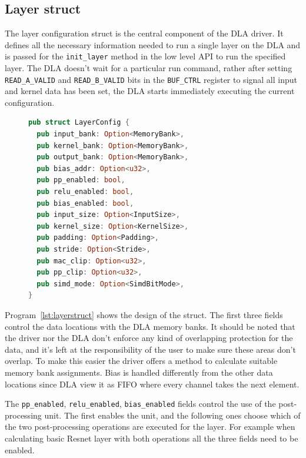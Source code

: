 \documentclass[12pt,a4paper,english
]{tunithesis}
\begin{document}
\subsection{Layer struct}
The layer configuration struct is the central component of the DLA driver. It defines all the necessary information needed to run a single layer on the DLA and is passed for the \texttt{init\_layer} method in the low level API to run the specified layer. The DLA doesn't wait for a particular run command, rather after setting \texttt{READ\_A\_VALID} and \texttt{READ\_B\_VALID} bits in the \texttt{BUF\_CTRL} register to signal all input and kernel data has been set, the DLA starts immediately executing the current configuration.

\begin{figure}
  \centering
\begin{lstlisting}[language=Rust, basicstyle=\footnotesize, caption={Example call to DLA high-level API}, label={lst:layerstruct}]
pub struct LayerConfig {
  pub input_bank: Option<MemoryBank>,
  pub kernel_bank: Option<MemoryBank>,
  pub output_bank: Option<MemoryBank>,
  pub bias_addr: Option<u32>,
  pub pp_enabled: bool,
  pub relu_enabled: bool,
  pub bias_enabled: bool,
  pub input_size: Option<InputSize>,
  pub kernel_size: Option<KernelSize>,
  pub padding: Option<Padding>,
  pub stride: Option<Stride>,
  pub mac_clip: Option<u32>,
  pub pp_clip: Option<u32>,
  pub simd_mode: Option<SimdBitMode>,
}
\end{lstlisting}
\end{figure}

Program~\ref{lst:layerstruct} shows the design of the struct. The first three fields control the data locations with the DLA memory banks. It should be noted that the driver nor the DLA don't enforce any kind of overlapping protection for the data, and it's left at the responsibility of the user to make sure these areas don't overlap. To make this easier the driver offers a method to calculate suitable memory bank assignments. Bias is handled differently from the other data locations since DLA view it as FIFO where every channel takes the next element.

The \texttt{pp\_enabled}, \texttt{relu\_enabled}, \texttt{bias\_enabled} fields control the use of the post-processing unit. The first enables the unit, and the following ones choose which of the two post-processing operations are executed for the layer. For example when calculating basic Resnet layer with both operations all the three fields need to be enabled.
\end{document}

